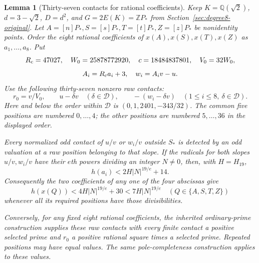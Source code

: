 \documentclass[11pt]{article}
\newtheorem{lemma}[theorem]{Lemma}
\theoremstyle{definition}
\theoremstyle{remark}
\newcommand{\Q}{\mathbb Q}
\newcommand{\Z}{\mathbb Z}
\begin{document}
\begin{lemma}[Thirty-seven contacts for rational coefficients]
\label{lem:quartic-rational37}
Keep $K=\Q(\sqrt2)$, $d=3-\sqrt2$, $D=d^2$, and
$G=2E(K)=\Z P_*$ from Section~\ref{sec:degree8-original}.
Let $A=[n]P_*,S=[s]P_*,T=[t]P_*,Z=[z]P_*$ be nonidentity points.
Order the eight rational coefficients of
$x(A),x(S),x(T),x(Z)$ as $a_1,\ldots,a_8$. Put
\[
 R_{\rm c}=47027,\quad W_0=25878772920,\quad c=18484837801,
 \quad V_0=32W_0,
\]
\[
 A_i=R_{\rm c}a_i+3,\quad w_i=A_iv-u.
\]
Use the following thirty-seven nonzero raw contacts:
\begin{equation}\label{eq:quartic-contacts37}
 r_0=v/V_0,\qquad u-\delta v\quad(\delta\in\mathcal D),
 \qquad -(w_i-\delta v)\quad(1\le i\le8,\ \delta\in\mathcal D).
\end{equation}
Here and below the order within $\mathcal D$ is
$(0,1,2401,-343/32)$. The common five positions are numbered $0,\ldots,4$;
the other positions are numbered $5,\ldots,36$ in the displayed order.

Every normalized odd contact of $u/v$ or $w_i/v$ outside $S_*$ is
detected by an odd valuation at a raw position belonging to that slope.
If the radicals for both slopes $u/v,w_i/v$ have their $e$th powers
dividing an integer $N\ne0$, then, with $H=H_{19}$,
\[
 h(a_i)<2H|N|^{19/e}+14.
\]
Consequently the two coefficients of any one of the four abscissas give
\begin{equation}\label{eq:quartic-direct-height}
 h(x(Q))<4H|N|^{19/e}+30<7H|N|^{19/e}
 \quad(Q\in\{A,S,T,Z\})
\end{equation}
whenever all its required positions have those divisibilities.

Conversely, for any fixed eight rational coefficients, the inherited
ordinary-prime construction supplies these raw contacts with every finite
contact a positive selected prime and $r_0$ a positive rational square
times a selected prime. Repeated positions may have equal values.
The same pole-completeness construction applies to these values.
\end{lemma}
\end{document}
